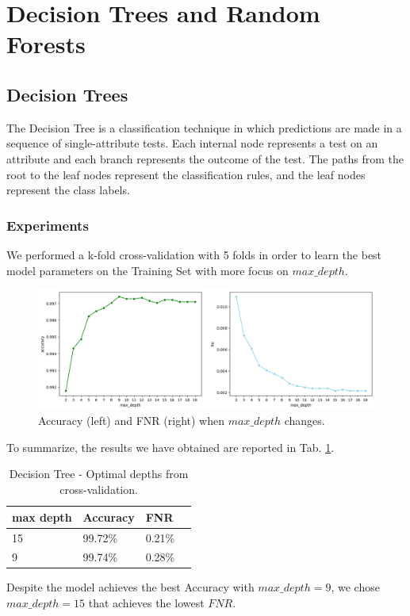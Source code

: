 \documentclass[twocolumn, switch]{article} %
\newcommand\x{0.7}
\begin{document}
\section{Decision Trees and Random Forests}
\label{sec:tree}
\subsection{Decision Trees}
The Decision Tree is a classification technique in which predictions are made in a sequence of single-attribute tests.
Each internal node represents a test on an attribute and each branch represents the outcome of the test. The paths from the root to the leaf nodes represent the classification rules, and the leaf nodes represent the class labels.
\subsubsection{Experiments}
\label{sub:tree}
We performed a k-fold cross-validation with 5 folds in order to learn the best model parameters on the Training Set with more focus on $max\_depth$.
\begin{figure}[ht!]
	\centering
	\includegraphics[width=\x\linewidth]{tree_accuracy_fnr.png}
	\caption{Accuracy (left) and FNR (right) when $max\_depth$ changes.}
	\label{fig:treetrain}
\end{figure}
To summarize, the results we have obtained are reported in Tab. \ref{tab:treetrain}.
\begin{table}[ht!]
	\centering
	{\small
		\begin{tabular}{|l|l|l|l|}
			\hline
			\textbf{max depth} & \textbf{Accuracy} & \textbf{FNR} \\ \hline
			15                 & 99.72\%           & 0.21\%       \\ \hline
			9                  & 99.74\%           & 0.28\%       \\ \hline
		\end{tabular}
		\caption{Decision Tree - Optimal depths from cross-validation.}
		\label{tab:treetrain}
		\vspace{-5mm}
	}
\end{table}
Despite the model achieves the best Accuracy with $max\_depth = 9$, we chose $max\_depth = 15$ that achieves the lowest $FNR$.
\end{document}
